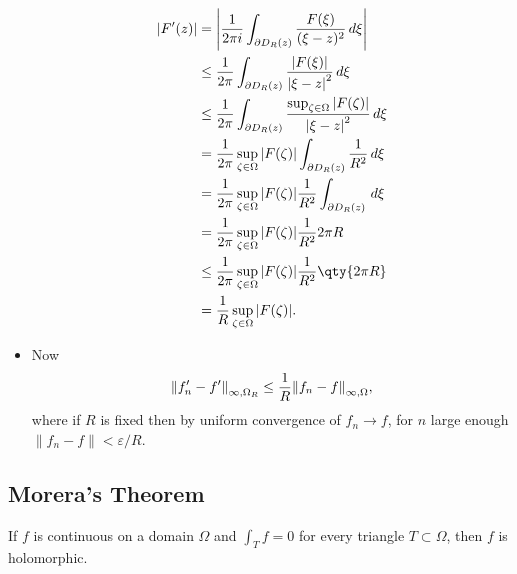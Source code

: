 \begin{solution}
\begin{itemize}
  \begin{align*}
  {\left\lvert {F'(z)} \right\rvert} 
  &= {\left\lvert { {1\over 2\pi i} \int_{{{\partial}}D_R(z)} {F(\xi) \over (\xi-z)^2 } \,d\xi} \right\rvert} \\
  &\leq {1\over 2\pi} \int_{{{\partial}}D_R(z)} { { {\left\lvert {F(\xi)} \right\rvert} \over {\left\lvert {\xi-z} \right\rvert}^2 }} \,d\xi\\
  &\leq {1\over 2\pi} \int_{{{\partial}}D_R(z)} { { \sup_{\zeta\in \Omega} {\left\lvert {F(\zeta)} \right\rvert} \over {\left\lvert {\xi-z} \right\rvert}^2 }} \,d\xi\\
  &= {1\over 2\pi} \sup_{\zeta\in \Omega} {\left\lvert {F(\zeta)} \right\rvert}  \int_{{{\partial}}D_R(z)} { { 1 \over R^2 }} \,d\xi\\
  &= {1\over 2\pi} \sup_{\zeta\in \Omega} {\left\lvert {F(\zeta)} \right\rvert}  {1\over R^2} \int_{{{\partial}}D_R(z)} \,d\xi\\
  &= {1\over 2\pi} \sup_{\zeta\in \Omega} {\left\lvert {F(\zeta)} \right\rvert}  {1\over R^2} 2\pi R   \\
  &\leq {1\over 2\pi} \sup_{\zeta\in \Omega} {\left\lvert {F(\zeta)} \right\rvert}  {1\over R^2}\qty{ 2\pi R}   \\
  &= {1\over R} \sup_{\zeta \in \Omega}{\left\lvert {F(\zeta)} \right\rvert}
  .\end{align*}
\item
  Now
  \begin{align*}
  {\left\lVert {f_n' - f'} \right\rVert}_{\infty, \Omega_R} \leq {1\over R} {\left\lVert {f_n - f} \right\rVert}_{\infty, \Omega}
  ,\end{align*}
  where if \(R\) is fixed then by uniform convergence of \(f_n\to f\),
  for \(n\) large enough
  \({\left\lVert {f_n - f} \right\rVert} < {\varepsilon}/R\).
\end{itemize}

\end{solution}

\hypertarget{moreras-theorem}{%
\subsection{Morera's Theorem}\label{moreras-theorem}}

\begin{theorem}\label{Morera}

If \(f\) is continuous on a domain \(\Omega\) and \(\int_T f = 0\) for
every triangle \(T\subset \Omega\), then \(f\) is holomorphic.

\end{theorem}

